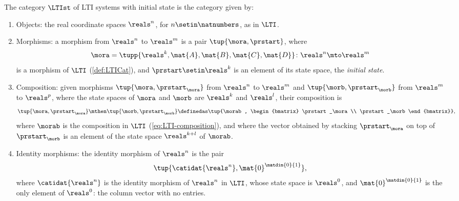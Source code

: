 \begin{ctdefinition}
    \label{def:LTIst}
    The category $\LTIst$ of LTI systems with initial state is the category given by:

    \constit

    \begin{enumerate}
        \item Objects: the real coordinate spaces $\reals^n$, for $n \setin \natnumbers$, as in $\LTI$.
        \item Morphisms: a morphism from $\reals^n$ to $\reals^m$ is a pair $\tup{\mora, \prstart}$, where
              \begin{equation}
                  \mora = \tupp{\reals^k, \mat{A}, \mat{B}, \mat{C}, \mat{D}} \colon \reals^n \mto \reals^m
              \end{equation}
              is a morphism of $\LTI$ (\cref{def:LTICat}), and $\prstart \setin \reals^k$ is an element of its state space, the \emph{initial state}.
        \item Composition: given morphisms $\tup{\mora, \prstart_\mora}$ from $\reals^n$ to $\reals^m$ and $\tup{\morb, \prstart_\morb}$ from $\reals^m$ to $\reals^p$, where the state spaces of $\mora$ and $\morb$ are $\reals^k$ and $\reals^l$, their composition is
              \begin{equation}
                  \label{eq:LTIst-composition}
                  \tup{\mora, \prstart_\mora} \mthen \tup{\morb, \prstart_\morb} \definedas \tup{\morab, \begin{bmatrix} \prstart_\mora \\ \prstart_\morb \end{bmatrix}},
              \end{equation}
              where $\morab$ is the composition in $\LTI$ (\cref{eq:LTI-composition}), and where the vector obtained by stacking $\prstart_\mora$ on top of $\prstart_\morb$ is an element of the state space $\reals^{k+l}$ of $\morab$.
        \item Identity morphisms: the identity morphism of $\reals^n$ is the pair
              \begin{equation}
                  \tup{\catidat{\reals^n}, \mat{0}^{\matdim{0}{1}}},
              \end{equation}
              where $\catidat{\reals^n}$ is the identity morphism of $\reals^n$ in $\LTI$, whose state space is $\reals^0$, and $\mat{0}^{\matdim{0}{1}}$ is the only element of $\reals^0$: the column vector with no entries.
    \end{enumerate}
\end{ctdefinition}

